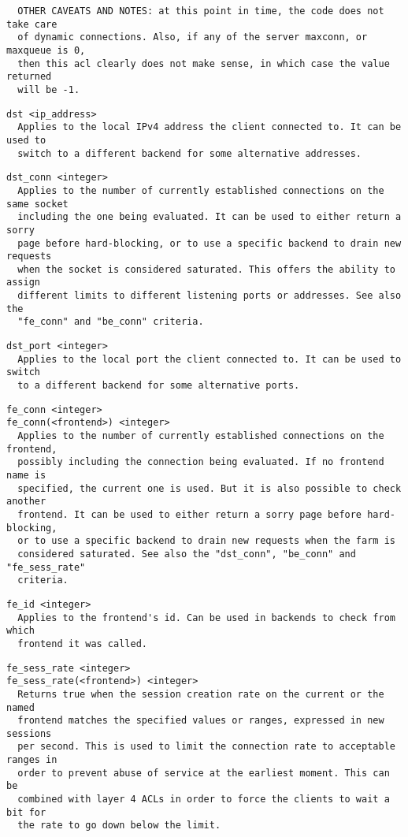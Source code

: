 \begin{verbatim}
  OTHER CAVEATS AND NOTES: at this point in time, the code does not take care
  of dynamic connections. Also, if any of the server maxconn, or maxqueue is 0,
  then this acl clearly does not make sense, in which case the value returned
  will be -1.
\end{verbatim}

\begin{verbatim}
dst <ip_address>
  Applies to the local IPv4 address the client connected to. It can be used to
  switch to a different backend for some alternative addresses.
\end{verbatim}

\begin{verbatim}
dst_conn <integer>
  Applies to the number of currently established connections on the same socket
  including the one being evaluated. It can be used to either return a sorry
  page before hard-blocking, or to use a specific backend to drain new requests
  when the socket is considered saturated. This offers the ability to assign
  different limits to different listening ports or addresses. See also the
  "fe_conn" and "be_conn" criteria.
\end{verbatim}

\begin{verbatim}
dst_port <integer>
  Applies to the local port the client connected to. It can be used to switch
  to a different backend for some alternative ports.
\end{verbatim}

\begin{verbatim}
fe_conn <integer>
fe_conn(<frontend>) <integer>
  Applies to the number of currently established connections on the frontend,
  possibly including the connection being evaluated. If no frontend name is
  specified, the current one is used. But it is also possible to check another
  frontend. It can be used to either return a sorry page before hard-blocking,
  or to use a specific backend to drain new requests when the farm is
  considered saturated. See also the "dst_conn", "be_conn" and "fe_sess_rate"
  criteria.
\end{verbatim}

\begin{verbatim}
fe_id <integer>
  Applies to the frontend's id. Can be used in backends to check from which
  frontend it was called.
\end{verbatim}

\begin{verbatim}
fe_sess_rate <integer>
fe_sess_rate(<frontend>) <integer>
  Returns true when the session creation rate on the current or the named
  frontend matches the specified values or ranges, expressed in new sessions
  per second. This is used to limit the connection rate to acceptable ranges in
  order to prevent abuse of service at the earliest moment. This can be
  combined with layer 4 ACLs in order to force the clients to wait a bit for
  the rate to go down below the limit.
\end{verbatim}

